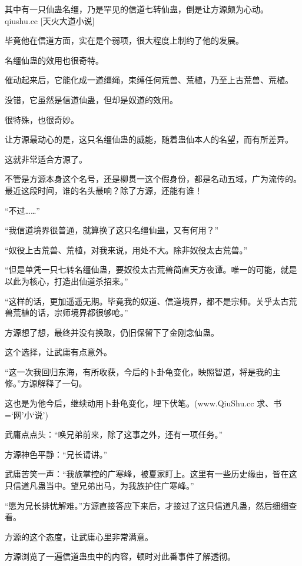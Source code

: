 
\begin{this_body}

其中有一只仙蛊名缰，乃是罕见的信道七转仙蛊，倒是让方源颇为心动。qiushu.cc [天火大道小说]

毕竟他在信道方面，实在是个弱项，很大程度上制约了他的发展。

名缰仙蛊的效用也很奇特。

催动起来后，它能化成一道缰绳，束缚任何荒兽、荒植，乃至上古荒兽、荒植。

没错，它虽然是信道仙蛊，但却是奴道的效用。

很特殊，也很奇妙。

让方源最动心的是，这只名缰仙蛊的威能，随着蛊仙本人的名望，而有所差异。

这就非常适合方源了。

不管是方源本身这个名号，还是柳贯一这个假身份，都是名动五域，广为流传的。最近这段时间，谁的名头最响？除了方源，还能有谁！

“不过……”

“我信道境界很普通，就算换了这只名缰仙蛊，又有何用？”

“奴役上古荒兽、荒植，对我来说，用处不大。除非奴役太古荒兽。”

“但是单凭一只七转名缰仙蛊，要奴役太古荒兽简直天方夜谭。唯一的可能，就是以此为核心，打造出仙道杀招来。”

“这样的话，更加遥遥无期。毕竟我的奴道、信道境界，都不是宗师。关乎太古荒兽荒植的话，宗师境界都很够呛。”

方源想了想，最终并没有换取，仍旧保留下了金刚念仙蛊。

这个选择，让武庸有点意外。

“这一次我回归东海，有所收获，今后的卜卦龟变化，映照智道，将是我的主修。”方源解释了一句。

这也是为他今后，继续动用卜卦龟变化，埋下伏笔。(www.QiuShu.cc 求、书=‘网’小‘说’)

武庸点点头：“唤兄弟前来，除了这事之外，还有一项任务。”

方源神色平静：“兄长请讲。”

武庸苦笑一声：“我族掌控的广寒峰，被夏家盯上。这里有一些历史缘由，皆在这只信道凡蛊当中。望兄弟出马，为我族护住广寒峰。”

“愿为兄长排忧解难。”方源直接答应下来后，才接过了这只信道凡蛊，然后细细查看。

方源的这个态度，让武庸心里非常满意。

方源浏览了一遍信道蛊虫中的内容，顿时对此番事件了解透彻。


\end{this_body}
